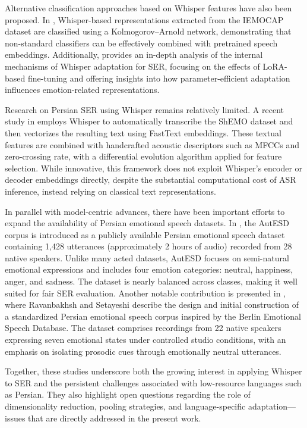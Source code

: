 \documentclass[conference]{IEEEtran}
\begin{document}
Alternative classification approaches based on Whisper features have also been proposed. In \cite{b9}, Whisper-based representations extracted from the IEMOCAP dataset are classified using a Kolmogorov–Arnold network, demonstrating that non-standard classifiers can be effectively combined with pretrained speech embeddings. Additionally, \cite{b6} provides an in-depth analysis of the internal mechanisms of Whisper adaptation for SER, focusing on the effects of LoRA-based fine-tuning and offering insights into how parameter-efficient adaptation influences emotion-related representations.

Research on Persian SER using Whisper remains relatively limited. A recent study in \cite{b2} employs Whisper to automatically transcribe the ShEMO dataset and then vectorizes the resulting text using FastText embeddings. These textual features are combined with handcrafted acoustic descriptors such as MFCCs and zero-crossing rate, with a differential evolution algorithm applied for feature selection. While innovative, this framework does not exploit Whisper’s encoder or decoder embeddings directly, despite the substantial computational cost of ASR inference, instead relying on classical text representations.

In parallel with model-centric advances, there have been important efforts to expand the availability of Persian emotional speech datasets. In \cite{b10}, the AutESD corpus is introduced as a publicly available Persian emotional speech dataset containing 1,428 utterances (approximately 2 hours of audio) recorded from 28 native speakers. Unlike many acted datasets, AutESD focuses on semi-natural emotional expressions and includes four emotion categories: neutral, happiness, anger, and sadness. The dataset is nearly balanced across classes, making it well suited for fair SER evaluation. Another notable contribution is presented in \cite{b11}, where Ravanbakhsh and Setayeshi describe the design and initial construction of a standardized Persian emotional speech corpus inspired by the Berlin Emotional Speech Database. The dataset comprises recordings from 22 native speakers expressing seven emotional states under controlled studio conditions, with an emphasis on isolating prosodic cues through emotionally neutral utterances.

Together, these studies underscore both the growing interest in applying Whisper to SER and the persistent challenges associated with low-resource languages such as Persian. They also highlight open questions regarding the role of dimensionality reduction, pooling strategies, and language-specific adaptation—issues that are directly addressed in the present work.
\end{document}
